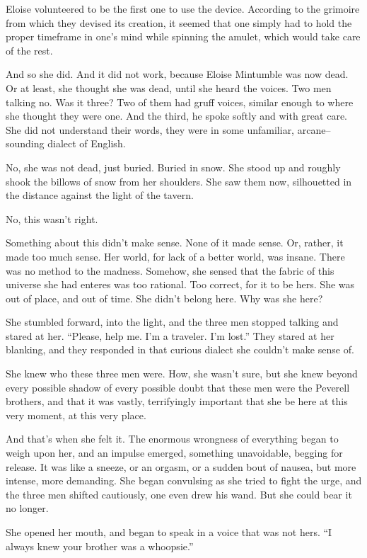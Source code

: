 Eloise volunteered to be the first one to use the device. According to the grimoire from which they devised its creation, it seemed that one simply had to hold the proper timeframe in one’s mind while spinning the amulet, which would take care of the rest.

And so she did. And it did not work, because Eloise Mintumble was now dead. Or at least, she thought she was dead, until she heard the voices. Two men talking{\el} no. Was it three? Two of them had gruff voices, similar enough to where she thought they were one. And the third, he spoke softly and with great care. She did not understand their words, they were in some unfamiliar, arcane\mbox{--}sounding dialect of English.

No, she was not dead, just buried. Buried in snow. She stood up and roughly shook the billows of snow from her shoulders. She saw them now, silhouetted in the distance against the light of the tavern.

No, this wasn’t right.

Something about this didn’t make sense. None of it made sense. Or, rather, it made too much sense. Her world, for lack of a better world, was insane. There was no method to the madness. Somehow, she sensed that the fabric of this universe she had enteres was too{\el} rational. Too{\el} correct, for it to be hers. She was out of place, and out of time. She didn’t belong here. Why was she here?

She stumbled forward, into the light, and the three men stopped talking and stared at her. “Please, help me. I’m a traveler. I’m lost.” They stared at her blanking, and they responded in that curious dialect she couldn’t make sense of.

She knew who these three men were. How, she wasn’t sure, but she knew beyond every possible shadow of every possible doubt that these men were the Peverell brothers, and that it was vastly, terrifyingly important that she be here at this very moment, at this very place.

And that’s when she felt it. The enormous wrongness of everything began to weigh upon her, and an impulse emerged, something unavoidable, begging for release. It was like a sneeze, or an orgasm, or a sudden bout of nausea, but more intense, more demanding. She began convulsing as she tried to fight the urge, and the three men shifted cautiously, one even drew his wand. But she could bear it no longer.

She opened her mouth, and began to speak in a voice that was not hers.
\simpleline
{}
“I always knew your brother was a whoopsie.”

